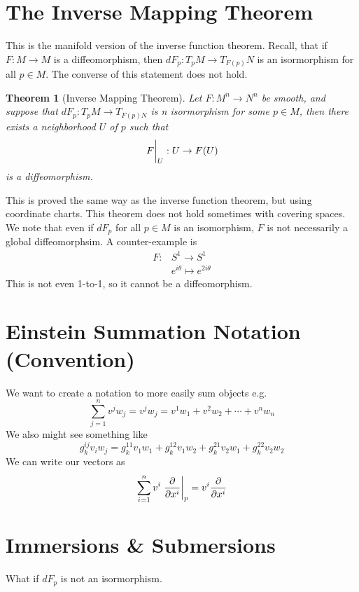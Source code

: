 \documentclass[a4paper]{article}
\newtheorem*{thm}{Theorem}
\begin{document}
\section*{The Inverse Mapping Theorem}%
This is the manifold version of the inverse function theorem. Recall, that if $F: M \rightarrow M$ is a diffeomorphism, then $dF_p: T_pM \rightarrow T_{F(p)}N$ is an isormorphism for all $p \in M$. The converse of this statement does not hold.

\begin{thm}[Inverse Mapping Theorem]
  Let $F: M^n \rightarrow N^n$ be smooth, and suppose that $dF_p: T_pM \rightarrow T_{F(p)N}$ is  n isormorphism for some $p \in M$, then there exists a neighborhood $U$ of $p$ such that 
  \[
    \eval{F}_U: U \rightarrow F(U)
  \]
  is a diffeomorphism.
\end{thm}
This is proved the same way as the inverse function theorem, but using coordinate charts. This theorem does not hold sometimes with covering spaces. We note that even if $dF_p$ for all $p \in M$ is an isomorphism, $F$ is not necessarily a global diffeomorphsim. A counter-example is 
\[
  \begin{aligned}
    F: &S^1 \rightarrow S^1 \\
      &e^{i\theta} \mapsto e^{2i\theta}
  \end{aligned}
\]
This is not even 1-to-1, so it cannot be a diffeomorphism.

\section*{Einstein Summation Notation (Convention)}%
We want to create a notation to more easily sum objects e.g.
\[
  \sum_{j=1}^{n}v^jw_j = v^jw_j = v^1w_1 + v^2w_2 + \cdots + v^nw_n
\]
We also might see something like
\[
  g^{ij}_k v_iw_j = g^{11}_kv_1w_1 + g^{12}_kv_1w_2 + g^{21}_kv_2w_1 + g^{22}_kv_2w_2   
\]
We can write our vectors as
\[
  \sum_{i=1}^n v^i \eval{\pdv{}{x^i}}_p = v^i \pdv{}{x^i}
\]

\section*{Immersions \& Submersions}%
What if $dF_p$ is not an isormorphism. 
\end{document}

